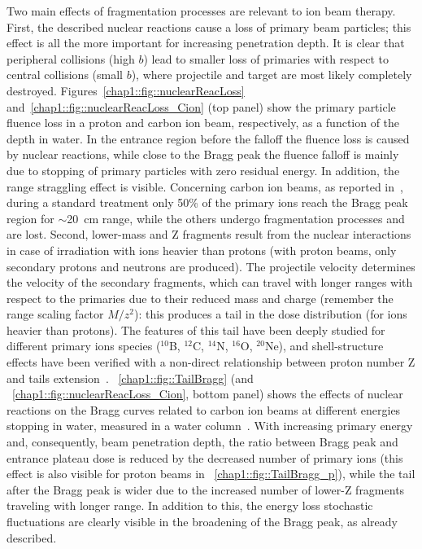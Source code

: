 Two main effects of fragmentation processes are relevant to ion beam therapy. 
First, the described nuclear reactions cause a loss of primary beam particles; this effect is all the more important for increasing penetration depth. It is clear that peripheral collisions (high $b$) lead to smaller loss of primaries with respect to central collisions (small $b$), where projectile and target are most likely completely destroyed. Figures~\ref{chap1::fig::nuclearReacLoss} and~\ref{chap1::fig::nuclearReacLoss_Cion} (top panel) show the primary particle fluence loss in a proton  and carbon ion beam, respectively, as a function of the depth in water. In the entrance region before the falloff the fluence loss is caused by nuclear reactions, while close to the Bragg peak the fluence falloff is mainly due to stopping of primary particles with zero residual energy. In addition, the range straggling effect is visible. Concerning carbon ion beams, as reported in~\cite{Durante2016}, during a standard treatment only 50\% of the primary ions reach the Bragg peak region for $\sim$20~cm range, while the others undergo fragmentation processes and are lost.
Second, lower-mass and Z fragments result from the nuclear interactions in case of irradiation with ions heavier than protons (with proton beams, only secondary protons and neutrons are produced).
The projectile velocity determines the velocity of the secondary fragments, which can travel with longer ranges with respect to the primaries due to their reduced mass and charge (remember the range scaling factor $M/z^{2}$): this produces a tail in the dose distribution (for ions heavier than protons). The features of this tail have been deeply studied for different primary ions species ($^{10}$B, $^{12}$C, $^{14}$N, $^{16}$O, $^{20}$Ne), and shell-structure effects have been verified with a non-direct relationship between proton number Z and tails extension~\parencite{Schall1996}.  \figurename~\ref{chap1::fig::TailBragg} (and \figurename~\ref{chap1::fig::nuclearReacLoss_Cion}, bottom panel) shows the effects of nuclear reactions on the Bragg curves related to carbon ion beams at different energies stopping in water, measured in a water column~\parencite{Schardt2008}. With increasing primary energy and, consequently, beam penetration depth, the ratio between Bragg peak and entrance plateau dose is reduced by the decreased number of primary ions (this effect is also visible for proton beams in \figurename~\ref{chap1::fig::TailBragg_p}), while the tail after the Bragg peak is wider due to the increased number of lower-Z fragments traveling with longer range. In addition to this, the energy loss stochastic fluctuations are clearly visible in the broadening of the Bragg peak, as already described.  

